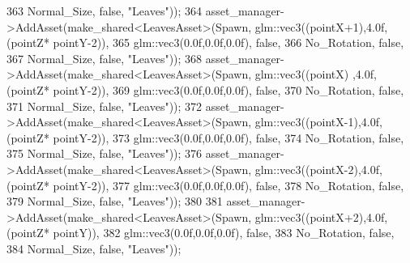 \begin{DoxyCode}
363                                                              Normal\_Size, \textcolor{keyword}{false}, \textcolor{stringliteral}{"Leaves"}));
364             asset\_manager->AddAsset(make\_shared<LeavesAsset>(Spawn, glm::vec3((pointX+1),4.0f,(pointZ*
      pointY-2)),
365                                                              glm::vec3(0.0f,0.0f,0.0f), \textcolor{keyword}{false},
366                                                              No\_Rotation, \textcolor{keyword}{false},
367                                                              Normal\_Size, \textcolor{keyword}{false}, \textcolor{stringliteral}{"Leaves"}));
368             asset\_manager->AddAsset(make\_shared<LeavesAsset>(Spawn, glm::vec3((pointX)  ,4.0f,(pointZ*
      pointY-2)),
369                                                              glm::vec3(0.0f,0.0f,0.0f), \textcolor{keyword}{false},
370                                                              No\_Rotation, \textcolor{keyword}{false},
371                                                              Normal\_Size, \textcolor{keyword}{false}, \textcolor{stringliteral}{"Leaves"}));
372             asset\_manager->AddAsset(make\_shared<LeavesAsset>(Spawn, glm::vec3((pointX-1),4.0f,(pointZ*
      pointY-2)),
373                                                              glm::vec3(0.0f,0.0f,0.0f), \textcolor{keyword}{false},
374                                                              No\_Rotation, \textcolor{keyword}{false},
375                                                              Normal\_Size, \textcolor{keyword}{false}, \textcolor{stringliteral}{"Leaves"}));
376             asset\_manager->AddAsset(make\_shared<LeavesAsset>(Spawn, glm::vec3((pointX-2),4.0f,(pointZ*
      pointY-2)),
377                                                              glm::vec3(0.0f,0.0f,0.0f), \textcolor{keyword}{false},
378                                                              No\_Rotation, \textcolor{keyword}{false},
379                                                              Normal\_Size, \textcolor{keyword}{false}, \textcolor{stringliteral}{"Leaves"}));
380  
381             asset\_manager->AddAsset(make\_shared<LeavesAsset>(Spawn, glm::vec3((pointX+2),4.0f,(pointZ*
      pointY)),
382                                                              glm::vec3(0.0f,0.0f,0.0f), \textcolor{keyword}{false},
383                                                              No\_Rotation, \textcolor{keyword}{false},
384                                                              Normal\_Size, \textcolor{keyword}{false}, \textcolor{stringliteral}{"Leaves"}));

\end{DoxyCode}
